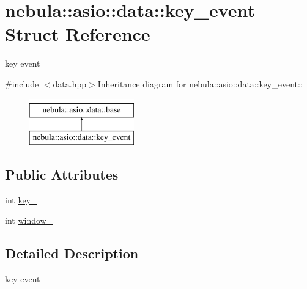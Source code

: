 \hypertarget{structnebula_1_1asio_1_1data_1_1key__event}{
\section{nebula::asio::data::key\_\-event Struct Reference}
\label{structnebula_1_1asio_1_1data_1_1key__event}
}


key event  


{\ttfamily \#include $<$data.hpp$>$}Inheritance diagram for nebula::asio::data::key\_\-event::\begin{figure}[H]
\begin{center}
\leavevmode
\includegraphics[height=2cm]{structnebula_1_1asio_1_1data_1_1key__event}
\end{center}
\end{figure}
\subsection*{Public Attributes}
\begin{DoxyCompactItemize}
\item 
int \hyperlink{structnebula_1_1asio_1_1data_1_1key__event_a174a1956fb32c85119c164909ca35c95}{key\_\-}
\item 
int \hyperlink{structnebula_1_1asio_1_1data_1_1key__event_a1d4f9f8811e4132aee740814fe3a6836}{window\_\-}
\end{DoxyCompactItemize}


\subsection{Detailed Description}
key event 

